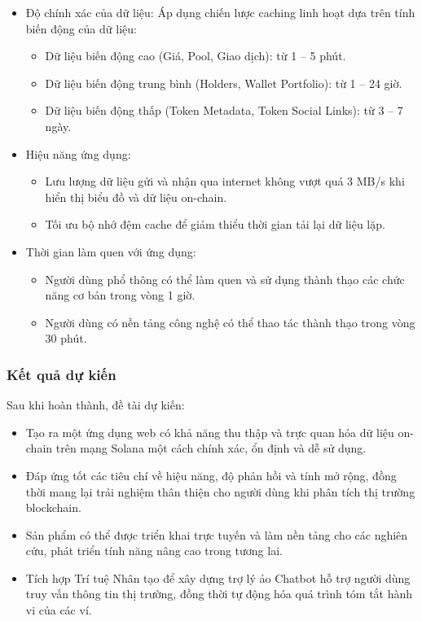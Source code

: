 \documentclass{article}[14pt]
\begin{document}
{\begin{itemize}
        \item Độ chính xác của dữ liệu: Áp dụng chiến lược caching linh hoạt dựa trên tính biến động của dữ liệu:
            \begin{itemize}
                \item Dữ liệu biến động cao (Giá, Pool, Giao dịch): từ 1 -- 5 phút.
                \item Dữ liệu biến động trung bình (Holders, Wallet Portfolio): từ 1 -- 24 giờ.
                \item Dữ liệu biến động thấp (Token Metadata, Token Social Links): từ 3 -- 7 ngày.
            \end{itemize}
        \item Hiệu năng ứng dụng:
        \begin{itemize}
            \item Lưu lượng dữ liệu gửi và nhận qua internet không vượt quá 3 MB/s khi hiển thị biểu đồ và dữ liệu on-chain.
            \item Tối ưu bộ nhớ đệm cache để giảm thiểu thời gian tải lại dữ liệu lặp.
        \end{itemize}
    
        \item Thời gian làm quen với ứng dụng:
        \begin{itemize}
            \item Người dùng phổ thông có thể làm quen và sử dụng thành thạo các chức năng cơ bản trong vòng 1 giờ.
            \item Người dùng có nền tảng công nghệ có thể thao tác thành thạo trong vòng 30 phút.
        \end{itemize}
    \end{itemize}

    \subsubsection{Kết quả dự kiến}

    Sau khi hoàn thành, đề tài dự kiến:
     \begin{itemize}
        \item Tạo ra một ứng dụng web có khả năng thu thập và trực quan hóa dữ liệu on-chain trên mạng Solana một cách chính xác, ổn định và dễ sử dụng.
        \item Đáp ứng tốt các tiêu chí về hiệu năng, độ phản hồi và tính mở rộng, đồng thời mang lại trải nghiệm thân thiện cho người dùng khi phân tích thị trường blockchain.
        \item Sản phẩm có thể được triển khai trực tuyến và làm nền tảng cho các nghiên cứu, phát triển tính năng nâng cao trong tương lai.
        \item Tích hợp Trí tuệ Nhân tạo để xây dựng trợ lý ảo Chatbot hỗ trợ người dùng truy vấn thông tin thị trường, đồng thời tự động hóa quá trình tóm tắt hành vi của các ví.
    \end{itemize} 

}
\end{document}
